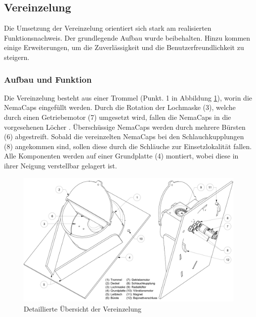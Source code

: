 \subsection{Vereinzelung} 
\label{sec:Vereinzelung}
Die Umsetzung der Vereinzelung orientiert sich stark am realisierten Funktionsnachweis. Der grundlegende Aufbau wurde beibehalten. Hinzu kommen einige Erweiterungen, um die Zuverlässigkeit und die Benutzerfreundlichkeit zu steigern.

\subsubsection{Aufbau und Funktion}
Die Vereinzelung besteht aus einer Trommel (Punkt. 1 in Abbildung \ref{fig:details_vereinzelung}), worin die NemaCaps eingefüllt werden. Durch die Rotation der Lochmaske (3), welche durch einen Getriebemotor (7) umgesetzt wird, fallen die NemaCaps in die vorgesehenen Löcher . Überschüssige NemaCaps werden durch mehrere Bürsten (6) abgestreift. Sobald die vereinzelten NemaCaps bei den Schlauchkupplungen (8) angekommen sind, sollen diese durch die Schläuche zur Einsetzlokalität fallen. Alle Komponenten werden auf einer Grundplatte (4) montiert, wobei diese in ihrer Neigung verstellbar gelagert ist.
	\begin{figure}[H]
	\includegraphics[scale=0.455]{Illustrationen/6-Umsetzung/details_vereinzelung.jpg}
	\caption{Detaillierte Übersicht der Vereinzelung}
	\label{fig:details_vereinzelung}
	\end{figure}

